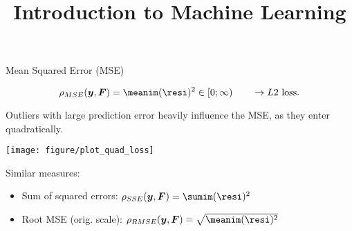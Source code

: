 





\newcommand{\titlefigure}{figure_man/plot_title_eval_regr}
\newcommand{\learninggoals}{
\item Know the definitions of mean squared error (MSE) and mean absolute error (MAE)
\item Understand the connections of MSE and MAE to L2 and L1 loss
\item Know the definition of Spearman's $\rho$
\item Know the definitions of $R^2$ and generalized $R^2$}


\title{Introduction to Machine Learning}
\date{}



\sloppy


\begin{vbframe}{Mean Squared Error (MSE)}

$$
\rho_{MSE}(\yv, \F) = \meanim (\resi)^2 \in [0;\infty) \qquad \rightarrow L2 \text{ loss}.
$$

\begin{minipage}[c]{0.33\textwidth}
  \raggedright
  \small
  Outliers with large prediction error heavily influence the MSE, as they 
  enter quadratically.
\end{minipage}%
\begin{minipage}[c]{0.67\textwidth}
  \begin{knitrout}\scriptsize
  \color{fgcolor}
  {\texttt{[image: figure/plot\_quad\_loss]}}
\end{knitrout}
\end{minipage}

\small
Similar measures:

\begin{itemize}
  \small
  \item Sum of squared errors: $\rho_{SSE}(\yv, \F)=\sumim (\resi)^2$
  \item Root MSE (orig. scale): $\rho_{RMSE}(\yv, \F)= \sqrt{\meanim (\resi)^2}$
\end{itemize}

\end{vbframe}

